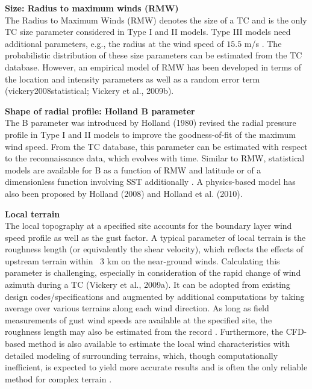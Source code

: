 \noindent\textbf{Size: Radius to maximum winds (RMW)} \\The Radius to Maximum Winds (RMW) denotes the size of a TC and is the only TC size parameter considered in Type I and II models. Type III models need additional parameters, e.g., the radius at the wind speed of $15.5$ m/s \citep{chavas2016model}. The probabilistic distribution of these size parameters can be estimated from the TC database. However, an empirical model of RMW has been developed in terms of the location and intensity parameters as well as a random error term (vickery2008statistical; Vickery et al., 2009b).
\newline

\noindent\textbf{Shape of radial profile: Holland B parameter} \\The B parameter was introduced by Holland (1980) revised the radial pressure profile in Type I and II models to improve the goodness-of-fit of the maximum wind speed. From the TC database, this parameter can be estimated with respect to the reconnaissance data, which evolves with time. Similar to RMW, statistical models are available for B as a function of RMW and latitude \citep{powell2005state} or of a dimensionless function involving SST additionally \citep{vickery2008statistical}. A physics-based model has also been proposed by Holland (2008) and Holland et al. (2010).
\newline

\noindent\textbf{Local terrain} \\The local topography at a specified site accounts for the boundary layer wind speed profile as well as the gust factor. A typical parameter of local terrain is the roughness length (or equivalently the shear velocity), which reflects the effects of upstream terrain within ~3 km on the near-ground winds. Calculating this parameter is challenging, especially in consideration of the rapid change of wind azimuth during a TC (Vickery et al., 2009a). It can be adopted from existing design codes/specifications and augmented by additional computations by taking average over various terrains along each wind direction. As long as field measurements of gust wind speeds are available at the specified site, the roughness length may also be estimated from the record \citep{masters2010objective}. Furthermore, the CFD-based method is also available to estimate the local wind characteristics with detailed modeling of surrounding terrains, which, though computationally inefficient, is expected to yield more accurate results and is often the only reliable method for complex terrain \citep{huang2013prediction,ishihara2005wind}. 
\newline

